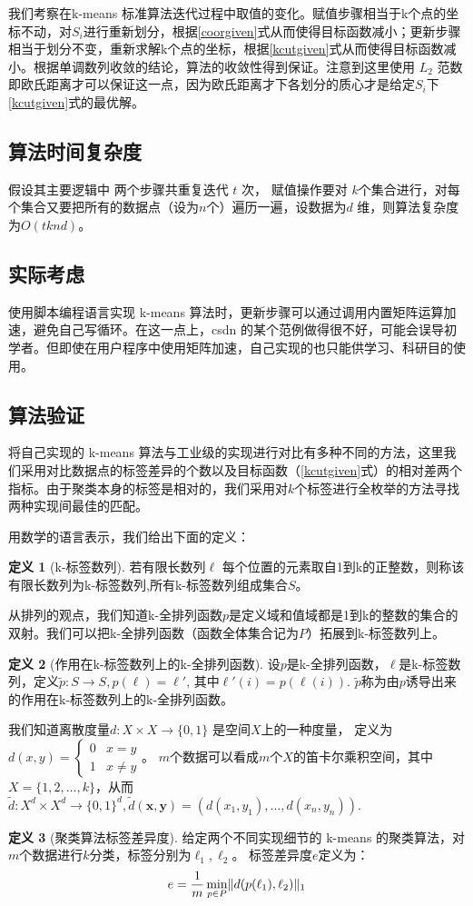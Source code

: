 \documentclass{ctexart}
\DeclarePairedDelimiter\norm{\lVert}{\rVert}
\theoremstyle{definition}
\newtheorem{definition}{定义}
\theoremstyle{remark}
\begin{document}
我们考察在k-means 标准算法迭代过程中取值的变化。赋值步骤相当于k个点的坐标不动，对$S_i$进行重新划分，根据\eqref{coorgiven}式从而使得目标函数减小；更新步骤相当于划分不变，重新求解k个点的坐标，根据\eqref{kcutgiven}式从而使得目标函数减小。根据单调数列收敛的结论，算法的收敛性得到保证。注意到这里使用 $L_2$ 范数即欧氏距离才可以保证这一点，因为欧氏距离才下各划分的质心才是给定$S_i$下\eqref{kcutgiven}式的最优解。

\subsection{算法时间复杂度}
假设其主要逻辑中 两个步骤共重复迭代 $t$ 次， 赋值操作要对 $k$个集合进行，对每个集合又要把所有的数据点（设为$n$个）遍历一遍，设数据为$d$ 维，则算法复杂度为$O(tknd)$。
\subsection{实际考虑}
使用脚本编程语言实现 k-means 算法时，更新步骤可以通过调用内置矩阵运算加速，避免自己写循环。在这一点上，csdn 的某个范例\cite{kmeans-csdn}做得很不好，可能会误导初学者。但即使在用户程序中使用矩阵加速，自己实现的也只能供学习、科研目的使用。
\subsection{算法验证}\label{verification}
将自己实现的 k-means 算法与工业级的实现进行对比有多种不同的方法，这里我们采用对比数据点的标签差异的个数以及目标函数（\eqref{kcutgiven}式）的相对差两个指标。由于聚类本身的标签是相对的，我们采用对$k$个标签进行全枚举的方法寻找两种实现间最佳的匹配。

用数学的语言表示，我们给出下面的定义：
\begin{definition}[k-标签数列]
若有限长数列$\ell$ 每个位置的元素取自1到k的正整数，则称该有限长数列为k-标签数列,所有k-标签数列组成集合$S$。
\end{definition}
从排列的观点，我们知道k-全排列函数$p$是定义域和值域都是1到k的整数的集合的双射。我们可以把k-全排列函数（函数全体集合记为$P$）拓展到k-标签数列上。
\begin{definition}[作用在k-标签数列上的k-全排列函数]
设$p$是k-全排列函数，$\ell$是k-标签数列，定义$\tilde{p}:S\to S,p(\ell)=\ell'$, 其中$\ell'(i)=p(\ell(i))$. $\tilde{p}$称为由$p$诱导出来的作用在k-标签数列上的k-全排列函数。
\end{definition}
我们知道离散度量$d:X\times X\to \{0,1\}$ 是空间$X$上的一种度量， 定义为 $ d(x,y)=\begin{cases}0 & x=y \\ 1 & x\neq y \end{cases}$。
$m$个数据可以看成$m$个$X$的笛卡尔乘积空间，其中$X=\{1,2,\dots,k\}$，从而$\tilde{d}: X^d \times X^d \to \{0,1\}^d,\tilde{d}(\bm{x},\bm{y})=(d(x_1,y_1), \dots, d(x_n,y_n)).$ 
\begin{definition}[聚类算法标签差异度]\label{def:label_diff}
给定两个不同实现细节的 k-means 的聚类算法，对$m$个数据进行$k$分类，标签分别为$\ell_1,\ell_2$。
标签差异度$e$定义为：
\begin{equation}
e= \frac{1}{m}\min_{p\in P} \norm{d(p(\ell_1),\ell_2)}_1
\end{equation}
\end{definition}
\end{document}
